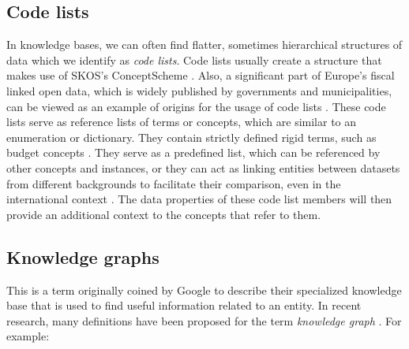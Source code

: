 \subsection{Code lists} 
In knowledge bases, we can often find flatter, sometimes hierarchical structures of data which we identify as \textit{code lists}. Code lists usually create a structure that makes use of SKOS's ConceptScheme %
\cite{data_cube}. Also, a significant part of Europe's fiscal linked open data, which is widely published by governments and municipalities, can be viewed as an example of origins for the usage of code lists \cite{DBLP:conf/icwe/MusyaffaHLOJAV18}. These code lists serve as reference lists of terms or concepts, which are similar to an enumeration or dictionary. They contain strictly defined rigid terms, such as budget concepts \cite{DBLP:conf/smap/FilippidisKKIB16}. They serve as a predefined list, which can be referenced by other concepts and instances, or they can act as linking entities between datasets from different backgrounds to facilitate their comparison, even in the international context \cite{DBLP:conf/smap/FilippidisKKIB16}. The data properties of these code list members will then provide an additional context to the concepts that refer to them. %

\subsection{Knowledge graphs}
This is a term originally coined by Google to describe their specialized knowledge base that is used to find useful information related to an entity. In recent research, many definitions have been proposed for the term \textit{knowledge graph} . For example: 

